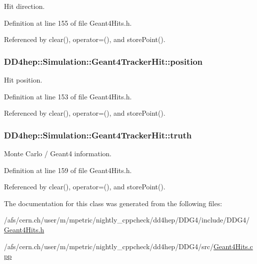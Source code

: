 Hit direction. 

Definition at line 155 of file Geant4Hits.h.

Referenced by clear(), operator=(), and storePoint().\hypertarget{class_d_d4hep_1_1_simulation_1_1_geant4_tracker_hit_a76e77eb92142c6f794ac37b6471df512}{
\subsubsection[{position}]{ {\bf DD4hep::Simulation::Geant4TrackerHit::position}}}
\label{class_d_d4hep_1_1_simulation_1_1_geant4_tracker_hit_a76e77eb92142c6f794ac37b6471df512}


Hit position. 

Definition at line 153 of file Geant4Hits.h.

Referenced by clear(), operator=(), and storePoint().\hypertarget{class_d_d4hep_1_1_simulation_1_1_geant4_tracker_hit_a154bd6a86c7e962c8e6bb4b010318a45}{
\subsubsection[{truth}]{ {\bf DD4hep::Simulation::Geant4TrackerHit::truth}}}
\label{class_d_d4hep_1_1_simulation_1_1_geant4_tracker_hit_a154bd6a86c7e962c8e6bb4b010318a45}


Monte Carlo / Geant4 information. 

Definition at line 159 of file Geant4Hits.h.

Referenced by clear(), operator=(), and storePoint().

The documentation for this class was generated from the following files:\begin{DoxyCompactItemize}
\item 
/afs/cern.ch/user/m/mpetric/nightly\_\-cppcheck/dd4hep/DDG4/include/DDG4/\hyperlink{_geant4_hits_8h}{Geant4Hits.h}\item 
/afs/cern.ch/user/m/mpetric/nightly\_\-cppcheck/dd4hep/DDG4/src/\hyperlink{_geant4_hits_8cpp}{Geant4Hits.cpp}\end{DoxyCompactItemize}
